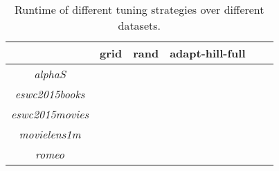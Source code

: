 \begin{table}[h!]
    \centering
    \begin{tabular}{| c | c | c | c | c | c | }
        \hline
        \textbf{}               & \textbf{grid} & \textbf{rand} & \textbf{adapt-hill-full} \\ \hline


        \textit{alphaS}         &               &               &               \\ \hline
        \textit{eswc2015books}  &               &               &               \\ \hline
        \textit{eswc2015movies} &               &               &               \\ \hline
        \textit{movielens1m}    &               &               &               \\ \hline
        \textit{romeo}          &               &               &               \\ \hline


    \end{tabular}
    \caption{Runtime of different tuning strategies over different datasets.}
    \label{tab:linkanalysis_tuning_sec}
\end{table}
